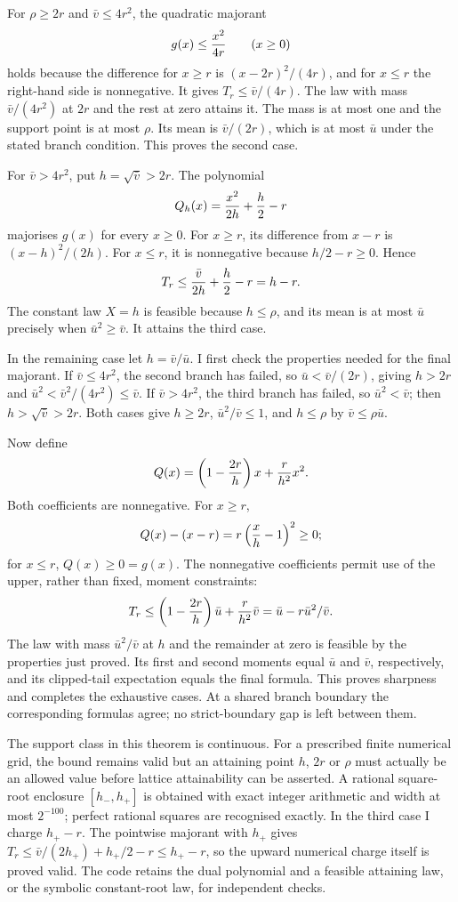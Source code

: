 For \(\rho\geq2r\) and \(\bar v\leq4r^2\), the quadratic majorant
\[
 g(x)\leq{x^2\over4r}
 \qquad(x\geq0)
\]
holds because the difference for \(x\geq r\) is \((x-2r)^2/(4r)\), and for \(x\leq r\) the right-hand side is nonnegative. It gives \(T_r\leq\bar v/(4r)\). The law with mass \(\bar v/(4r^2)\) at \(2r\) and the rest at zero attains it. The mass is at most one and the support point is at most \(\rho\). Its mean is \(\bar v/(2r)\), which is at most \(\bar u\) under the stated branch condition. This proves the second case.

For \(\bar v>4r^2\), put \(h=\sqrt{\bar v}>2r\). The polynomial
\[
 Q_h(x)={x^2\over2h}+{h\over2}-r
\]
majorises \(g(x)\) for every \(x\geq0\). For \(x\geq r\), its difference from \(x-r\) is \((x-h)^2/(2h)\). For \(x\leq r\), it is nonnegative because \(h/2-r\geq0\). Hence
\[
 T_r\leq{\bar v\over2h}+{h\over2}-r=h-r.
\]
The constant law \(X=h\) is feasible because \(h\leq\rho\), and its mean is at most \(\bar u\) precisely when \(\bar u^2\geq\bar v\). It attains the third case.

In the remaining case let \(h=\bar v/\bar u\). I first check the properties needed for the final majorant. If \(\bar v\leq4r^2\), the second branch has failed, so \(\bar u<\bar v/(2r)\), giving \(h>2r\) and
\(\bar u^2<\bar v^2/(4r^2)\leq\bar v\). If \(\bar v>4r^2\), the third branch has failed, so \(\bar u^2<\bar v\); then \(h>\sqrt{\bar v}>2r\). Both cases give \(h\geq2r\), \(\bar u^2/\bar v\leq1\), and \(h\leq\rho\) by \(\bar v\leq\rho\bar u\).

Now define
\[
 Q(x)=\left(1-{2r\over h}\right)x+{r\over h^2}x^2.
\]
Both coefficients are nonnegative. For \(x\geq r\),
\[
 Q(x)-(x-r)=r\left({x\over h}-1\right)^2\geq0;
\]
for \(x\leq r\), \(Q(x)\geq0=g(x)\). The nonnegative coefficients permit use of the upper, rather than fixed, moment constraints:
\[
 T_r\leq\left(1-{2r\over h}\right)\bar u
                   +{r\over h^2}\bar v
       =\bar u-r\bar u^2/\bar v.
\]
The law with mass \(\bar u^2/\bar v\) at \(h\) and the remainder at zero is feasible by the properties just proved. Its first and second moments equal \(\bar u\) and \(\bar v\), respectively, and its clipped-tail expectation equals the final formula. This proves sharpness and completes the exhaustive cases. At a shared branch boundary the corresponding formulas agree; no strict-boundary gap is left between them.

The support class in this theorem is continuous. For a prescribed finite numerical grid, the bound remains valid but an attaining point \(h\), \(2r\) or \(\rho\) must actually be an allowed value before lattice attainability can be asserted. A rational square-root enclosure \([h_-,h_+]\) is obtained with exact integer arithmetic and width at most \(2^{-100}\); perfect rational squares are recognised exactly. In the third case I charge \(h_+-r\). The pointwise majorant with \(h_+\) gives
\(T_r\leq\bar v/(2h_+)+h_+/2-r\leq h_+-r\), so the upward numerical charge itself is proved valid. The code retains the dual polynomial and a feasible attaining law, or the symbolic constant-root law, for independent checks.

